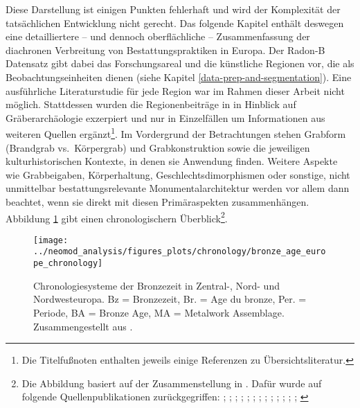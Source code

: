 \documentclass[openany,twoside,twocolumn]{book}
\let\rmarkdownfootnote\footnote%
\def\footnote{\protect\rmarkdownfootnote}
\begin{document}
Diese Darstellung ist einigen Punkten fehlerhaft und wird der
Komplexität der tatsächlichen Entwicklung nicht gerecht. Das folgende
Kapitel enthält deswegen eine detailliertere -- und dennoch
oberflächliche -- Zusammenfassung der diachronen Verbreitung von
Bestattungspraktiken in Europa. Der Radon-B Datensatz gibt dabei das
Forschungsareal und die künstliche Regionen vor, die als
Beobachtungseinheiten dienen (siehe Kapitel
\ref{data-prep-and-segmentation}). Eine ausführliche Literaturstudie für
jede Region war im Rahmen dieser Arbeit nicht möglich. Stattdessen
wurden die Regionenbeiträge in \textcite{fokkens_oxford_2013} in
Hinblick auf Gräberarchäologie exzerpiert und nur in Einzelfällen um
Informationen aus weiteren Quellen ergänzt\footnote{Die Titelfußnoten
  enthalten jeweils einige Referenzen zu Übersichtsliteratur.}. Im
Vordergrund der Betrachtungen stehen Grabform (Brandgrab vs.~Körpergrab)
und Grabkonstruktion sowie die jeweiligen kulturhistorischen Kontexte,
in denen sie Anwendung finden. Weitere Aspekte wie Grabbeigaben,
Körperhaltung, Geschlechtsdimorphismen oder sonstige, nicht unmittelbar
bestattungsrelevante Monumentalarchitektur werden vor allem dann
beachtet, wenn sie direkt mit diesen Primäraspekten zusammenhängen.
Abbildung \ref{fig:general-chronology} gibt einen chronologischern
Überblick\footnote{Die Abbildung basiert auf der Zusammenstellung in
  \textcite{roberts_old_2013}. Dafür wurde auf folgende
  Quellenpublikationen zurückgegriffen:
  \textcite{arnoldussen_bronze_2008}; \textcite{bourgeois_lage_2005};
  \textcite{burgess_bronze_1974}; \textcite{burgess_age_1980};
  \textcite{brindley_dating_2007}; \textcite{eogan_accomplished_1994};
  \textcite{gerloff_reineckes_2007}; \textcite{gerloff_atlantic_2010};
  \textcite{de_laet_belgique_1982};
  \textcite{lanting_14c-chronologie_2001};
  \textcite{louwe_kooijmanns_prehistory_2005};
  \textcite{needham_chronology_1996};
  \textcite{needham_independent_1997}; \textcite{needham_first_2010}}.

\begin{landscape}
\begin{figure}
\texttt{[image: ../neomod\_analysis/figures\_plots/chronology/bronze\_age\_europe\_chronology]} \caption[Chronologiesysteme der Bronzezeit in Zentral-, Nord- und Nordwesteuropa]{Chronologiesysteme der Bronzezeit in Zentral-, Nord- und Nordwesteuropa. Bz = Bronzezeit, Br. = Age du bronze, Per. = Periode, BA = Bronze Age, MA = Metalwork Assemblage. Zusammengestellt aus \textcite{roberts_old_2013}.}\label{fig:general-chronology}
\end{figure}
\end{landscape}
\end{document}
